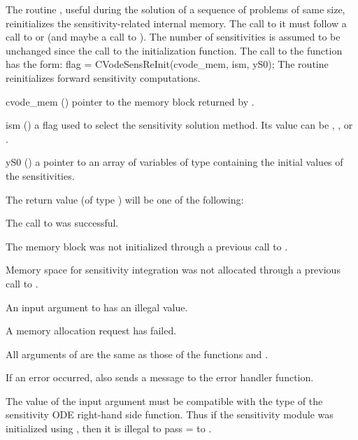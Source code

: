 The routine , useful during the solution of a
sequence of problems of same size, reinitializes the
sensitivity-related internal memory. The call to it must follow a call
to  or  (and maybe a call to
).  The number  of sensitivities is assumed to
be unchanged since the call to the initialization function.
The call to the  function has the form:
{
  flag = CVodeSensReInit(cvode\_mem, ism, yS0);
}
{
  The routine  reinitializes forward sensitivity computations.
}
{
  \begin{args}

  \item[cvode\_mem] ()
    pointer to the {\cvodes} memory block returned by .

  \item[ism] ()
    a flag used to select the sensitivity solution method.  Its value can 
    be , , or .

  \item[yS0] () 
    a pointer to an array of  variables of type  containing the 
    initial values of the sensitivities.

  \end{args}
}
{
  The return value  (of type ) will be one of the following:
  \begin{args}
  \item[\Id{CV\_SUCCESS}]
    The call to  was successful.
  \item[\Id{CV\_MEM\_NULL}] 
    The {\cvodes} memory block was not initialized through a 
    previous call to .
  \item[\Id{CV\_NO\_SENS}]
    Memory space for sensitivity integration was not allocated through a 
    previous call to .
  \item[\Id{CV\_ILL\_INPUT}] 
    An input argument to  has an illegal value.    
  \item[\Id{CV\_MEM\_FAIL}] 
    A memory allocation request has failed.
  \end{args}
}
{
  All arguments of  are the same as those of the functions
   and .

  If an error occurred,  also sends a message to the
  error handler function.

  {\warn}The value of the input argument  must be compatible with
  the type of the sensitivity ODE right-hand side function.  Thus
  if the sensitivity module was initialized using , then
  it is illegal to pass  =  to .
}
